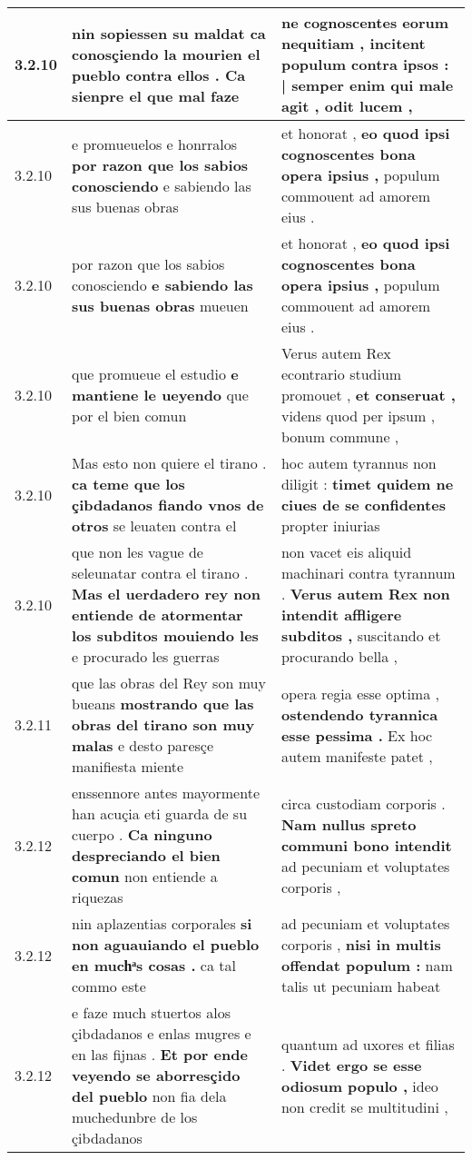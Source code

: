 \begin{tabular}{|p{1cm}|p{6.5cm}|p{6.5cm}|}
3.2.10 & nin sopiessen su maldat \textbf{ ca conosçiendo la mourien el pueblo contra ellos . } Ca sienpre el que mal faze & ne cognoscentes eorum nequitiam , \textbf{ incitent populum contra ipsos : | semper enim } qui male agit , odit lucem , \\\hline
3.2.10 & e promueuelos e honrralos \textbf{ por razon que los sabios conosciendo } e sabiendo las sus buenas obras & et honorat , \textbf{ eo quod ipsi cognoscentes bona opera ipsius , } populum commouent ad amorem eius . \\\hline
3.2.10 & por razon que los sabios conosciendo \textbf{ e sabiendo las sus buenas obras } mueuen & et honorat , \textbf{ eo quod ipsi cognoscentes bona opera ipsius , } populum commouent ad amorem eius . \\\hline
3.2.10 & que promueue el estudio \textbf{ e mantiene le ueyendo } que por el bien comun & Verus autem Rex econtrario studium promouet , \textbf{ et conseruat , } videns quod per ipsum , bonum commune , \\\hline
3.2.10 & Mas esto non quiere el tirano . \textbf{ ca teme que los çibdadanos fiando vnos de otros } se leuaten contra el & hoc autem tyrannus non diligit : \textbf{ timet quidem ne ciues de se confidentes } propter iniurias \\\hline
3.2.10 & que non les vague de seleunatar contra el tirano . \textbf{ Mas el uerdadero rey non entiende de atormentar los subditos mouiendo les } e procurado les guerras & non vacet eis aliquid machinari contra tyrannum . \textbf{ Verus autem Rex non intendit affligere subditos , } suscitando et procurando bella , \\\hline
3.2.11 & que las obras del Rey son muy bueans \textbf{ mostrando que las obras del tirano son muy malas } e desto paresçe manifiesta miente & opera regia esse optima , \textbf{ ostendendo tyrannica esse pessima . } Ex hoc autem manifeste patet , \\\hline
3.2.12 & enssennore antes mayormente han acuçia eti guarda de su cuerpo . \textbf{ Ca ninguno despreciando el bien comun } non entiende a riquezas & circa custodiam corporis . \textbf{ Nam nullus spreto communi bono intendit } ad pecuniam et voluptates corporis , \\\hline
3.2.12 & nin aplazentias corporales \textbf{ si non aguauiando el pueblo en muchͣs cosas . } ca tal commo este & ad pecuniam et voluptates corporis , \textbf{ nisi in multis offendat populum : } nam talis ut pecuniam habeat \\\hline
3.2.12 & e faze much stuertos alos çibdadanos e enlas mugres e en las fijnas . \textbf{ Et por ende veyendo se aborresçido del pueblo } non fia dela muchedunbre de los çibdadanos & quantum ad uxores et filias . \textbf{ Videt ergo se esse odiosum populo , } ideo non credit se multitudini , \\\hline

\end{tabular}
